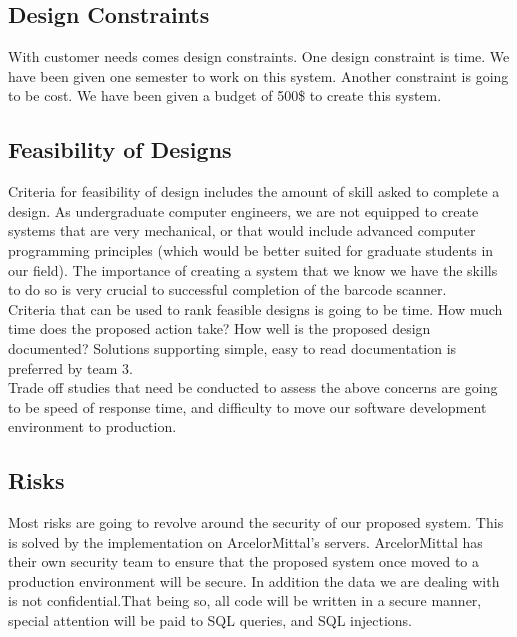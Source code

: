 \documentclass[Letter,11pt]{article}
\begin{document}
	\subsection{Design Constraints}
	With customer needs comes design constraints. One design constraint is time. We have been given one semester to work on this system. Another constraint is going to be cost. We have been given a budget of 500\$ to create this system.\\ 
	\subsection{Feasibility of Designs}
	Criteria for feasibility of design includes the amount of skill asked to complete a design. As undergraduate computer engineers, we are not equipped to create systems that are very mechanical, or that would include advanced computer programming principles (which would be better suited for graduate students in our field). The importance of creating a system that we know we have the skills to do so is very crucial to successful completion of the barcode scanner.  \\
	Criteria that can be used to rank feasible designs is going to be time. How much time does the proposed action take? How well is the proposed design documented? Solutions supporting simple, easy to read documentation is preferred by team 3. \\
	Trade off studies that need be conducted to assess the above concerns are going to be speed of response time, and difficulty to move our software development environment to production.
	\subsection{Risks}
	Most risks are going to revolve around the security of our proposed system. This is solved by the implementation on ArcelorMittal's servers. ArcelorMittal has their own security team to ensure that the proposed system once moved to a production environment will be secure. In addition the data we are dealing with is not confidential.That being so, all code will be written in a secure manner, special attention will be paid to SQL queries, and SQL injections.   
\end{document}
